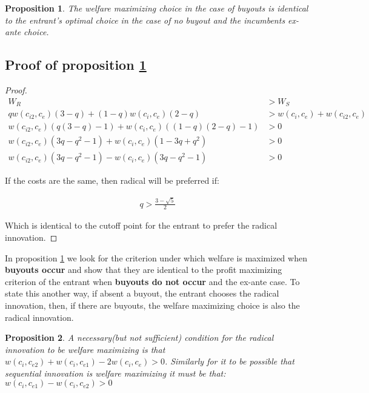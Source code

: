 \documentclass[11pt]{article}
\newtheorem{proposition}{Proposition}
\begin{document}
\begin{proposition}\label{propwelfare}
The welfare maximizing choice in the case of buyouts is identical to the entrant's optimal choice in the case of no buyout and the incumbents ex-ante choice. 
\end{proposition}

\subsection{Proof of proposition \ref{propwelfare}}

\begin{proof} \label{buyoutnobuyout}
\begin{align*}
W_R&> W_S \\
q w(c_{i2}, c_{e})(3-q )
+(1-q)w(c_{i}, c_{e})(2-q) &> w(c_{i}, c_{e}) + w(c_{i2}, c_{e}) \\
 w(c_{i2}, c_{e})(q(3-q) -1)
+w(c_{i}, c_{e})((1-q)(2-q)-1)  &> 0 \\
w(c_{i2}, c_{e})(3q-q^2-1)+w(c_{i}, c_{e})(1-3q+q^2)&>0 \\
 w(c_{i2}, c_{e})(3q-q^2-1)-w(c_{i}, c_{e})(3q-q^2-1) &>0 
\end{align*}

If the costs are the same, then radical will be preferred if:

\begin{align}
q> \frac{3-\sqrt{5}}{2}
\end{align}

Which is identical to the cutoff point for the entrant to prefer the radical innovation. 

\end{proof}

In proposition \ref{propwelfare} we look for the criterion under which welfare is maximized when \textbf{ buyouts occur} and show that they are identical to the profit maximizing criterion of the entrant when \textbf{buyouts do not occur} and the ex-ante case. To state this another way, if absent a buyout, the entrant chooses the radical innovation, then, if there are buyouts, the welfare maximizing choice is also the radical innovation. 

\begin{proposition}
\label{welfare1}
A necessary(but not sufficient) condition for the radical innovation to be welfare maximizing is that $w(c_{i}, c_{e2})+w(c_{i}, c_{e1})-2 w(c_{i}, c_{e}) > 0 $. 
Similarly for it to be possible that sequential innovation is welfare maximizing it must be that: 
$w(c_{i}, c_{e1})-w(c_{i}, c_{e2}) > 0$
\end{proposition}
\end{document}
